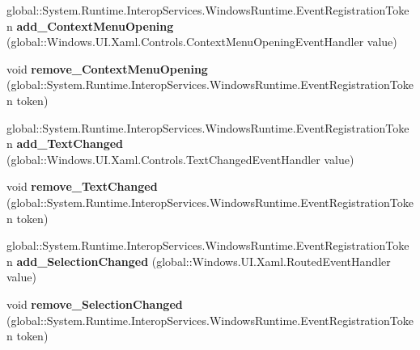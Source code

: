 \begin{DoxyCompactItemize}
\item 
\mbox{\label{interface_windows_1_1_u_i_1_1_xaml_1_1_controls_1_1_i_text_box_a13a0570373297c92254b50875850cec9}} 
global\+::\+System.\+Runtime.\+Interop\+Services.\+Windows\+Runtime.\+Event\+Registration\+Token {\bfseries add\+\_\+\+Context\+Menu\+Opening} (global\+::\+Windows.\+U\+I.\+Xaml.\+Controls.\+Context\+Menu\+Opening\+Event\+Handler value)
\item 
\mbox{\label{interface_windows_1_1_u_i_1_1_xaml_1_1_controls_1_1_i_text_box_a51914ddc8aa63000ce56d9ef69853f43}} 
void {\bfseries remove\+\_\+\+Context\+Menu\+Opening} (global\+::\+System.\+Runtime.\+Interop\+Services.\+Windows\+Runtime.\+Event\+Registration\+Token token)
\item 
\mbox{\label{interface_windows_1_1_u_i_1_1_xaml_1_1_controls_1_1_i_text_box_adfbfa844057a8d451f7ce00ca1632498}} 
global\+::\+System.\+Runtime.\+Interop\+Services.\+Windows\+Runtime.\+Event\+Registration\+Token {\bfseries add\+\_\+\+Text\+Changed} (global\+::\+Windows.\+U\+I.\+Xaml.\+Controls.\+Text\+Changed\+Event\+Handler value)
\item 
\mbox{\label{interface_windows_1_1_u_i_1_1_xaml_1_1_controls_1_1_i_text_box_a32cd181527e79d8b2154c89ea0984dea}} 
void {\bfseries remove\+\_\+\+Text\+Changed} (global\+::\+System.\+Runtime.\+Interop\+Services.\+Windows\+Runtime.\+Event\+Registration\+Token token)
\item 
\mbox{\label{interface_windows_1_1_u_i_1_1_xaml_1_1_controls_1_1_i_text_box_a981d451491963f006453c0c0b14a8fda}} 
global\+::\+System.\+Runtime.\+Interop\+Services.\+Windows\+Runtime.\+Event\+Registration\+Token {\bfseries add\+\_\+\+Selection\+Changed} (global\+::\+Windows.\+U\+I.\+Xaml.\+Routed\+Event\+Handler value)
\item 
\mbox{\label{interface_windows_1_1_u_i_1_1_xaml_1_1_controls_1_1_i_text_box_a3cb1d0fb9f12435f1a1ccee943050023}} 
void {\bfseries remove\+\_\+\+Selection\+Changed} (global\+::\+System.\+Runtime.\+Interop\+Services.\+Windows\+Runtime.\+Event\+Registration\+Token token)

\end{DoxyCompactItemize}
